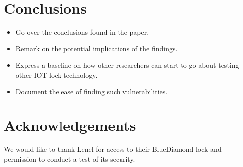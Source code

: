 \documentclass[10pt,twocolumn,letterpaper]{article}
\begin{document}
\section{Conclusions}
\begin{itemize}
    \item Go over the conclusions found in the paper.
    \item Remark on the potential implications of the findings.
    \item Express a baseline on how other researchers can start to go about testing other IOT lock technology.
    \item Document the ease of finding such vulnerabilities.
\end{itemize}

\section{Acknowledgements}
We would like to thank Lenel for access to their BlueDiamond lock and permission to conduct a test of its security. 




\end{document}
